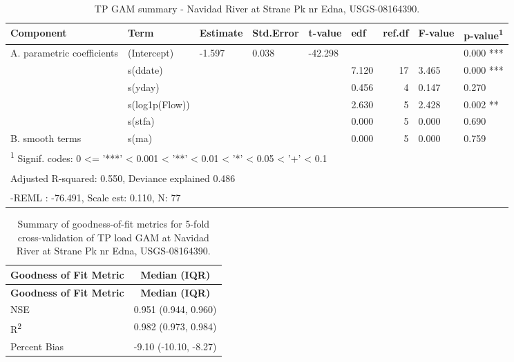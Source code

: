 \documentclass[
]{article}
\newenvironment{widestuff}{\begin{table}[h]\begin{adjustwidth}{-4.5cm}{-4.5cm}\centering}{\end{adjustwidth}\end{table}}
\begin{document}
\begin{widestuff}

\caption{TP GAM summary - Navidad River at Strane Pk nr Edna, USGS-08164390.}
\centering
\begin{tabular}[t]{llllllrll}
\toprule
Component & Term & Estimate & Std.Error & t-value & edf & ref.df & F-value & p-value\textsuperscript{1}\\
\midrule
A. parametric coefficients & (Intercept) & -1.597 & 0.038 & -42.298 &  &  &  & 0.000 ***\\
\cmidrule{1-9}
 & s(ddate) &  &  &  & 7.120 & 17 & 3.465 & 0.000 ***\\

 & s(yday) &  &  &  & 0.456 & 4 & 0.147 & 0.270\\

 & s(log1p(Flow)) &  &  &  & 2.630 & 5 & 2.428 & 0.002 **\\

 & s(stfa) &  &  &  & 0.000 & 5 & 0.000 & 0.690\\

\multirow[t]{-5}{*}{\raggedright\arraybackslash B. smooth terms} & s(ma) &  &  &  & 0.000 & 5 & 0.000 & 0.759\\
\bottomrule
\multicolumn{9}{l}{\textsuperscript{1} Signif. codes: 0 <= '***' < 0.001 < '**' < 0.01 < '*' < 0.05 < '+' < 0.1}\\
\multicolumn{9}{l}{\textsuperscript{} Adjusted R-squared: 0.550, Deviance explained 0.486}\\
\multicolumn{9}{l}{\textsuperscript{} -REML : -76.491, Scale est: 0.110, N: 77}\\
\end{tabular}
\end{widestuff}

\hypertarget{tbl-TP08164390-CV}{}
\begin{longtable}[]{@{}lc@{}}
\caption{\label{tbl-TP08164390-CV}Summary of goodness-of-fit metrics for
5-fold cross-validation of TP load GAM at Navidad River at Strane Pk nr
Edna, USGS-08164390.}\tabularnewline
\toprule()
\textbf{Goodness of Fit Metric} & \textbf{Median (IQR)} \\
\midrule()
\endfirsthead
\toprule()
\textbf{Goodness of Fit Metric} & \textbf{Median (IQR)} \\
\midrule()
\endhead
NSE & 0.951 (0.944, 0.960) \\
R\textsuperscript{2} & 0.982 (0.973, 0.984) \\
Percent Bias & -9.10 (-10.10, -8.27) \\
\bottomrule()
\end{longtable}
\end{document}
